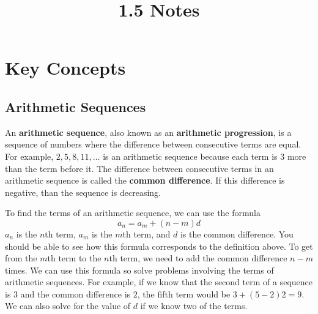 \documentclass{article}
\title{1.5 Notes}
\author{}
\date{}
\begin{document}
    \maketitle

    \section*{Key Concepts}
    \subsection*{Arithmetic Sequences}
    An \textbf{arithmetic sequence}, also known as an \textbf{arithmetic progression}, is a sequence of numbers where the difference between consecutive terms are equal. For example, $2, 5, 8, 11, \dots$ is an arithmetic sequence because each term is $3$ more than the term before it. The difference between consecutive terms in an arithmetic sequence is called the \textbf{common difference}. If this difference is negative, than the sequence is decreasing.

    To find the terms of an arithmetic sequence, we can use the formula
    \[a_n = a_m + (n - m)d\]
    $a_n$ is the $n$th term, $a_m$ is the $m$th term, and $d$ is the common difference. You should be able to see how this formula corresponds to the definition above. To get from the $m$th term to the $n$th term, we need to add the common difference $n - m$ times. We can use this formula so solve problems involving the terms of arithmetic sequences. For example, if we know that the second term of a sequence is $3$ and the common difference is $2$, the fifth term would be $3 + (5 - 2)2 = 9$. We can also solve for the value of $d$ if we know two of the terms.
\end{document}
